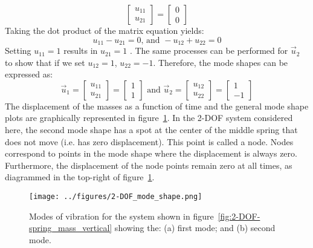 \documentclass[12pt,letter]{article}
\begin{document}
\begin{example}
\begin{equation}
		 \begin{bmatrix} u_{11}\\ u_{21}\end{bmatrix}=\begin{bmatrix} 0\\ 0\end{bmatrix}
	\end{equation}
	Taking the dot product of the matrix equation yields:
	\begin{equation}
		u_{11} - u_{21}=0 \text{, and } - u_{12} + u_{22}=0
	\end{equation}
	Setting $u_{11} = 1$ results in $u_{21} = 1$ . The same processes can be performed for $\vec{u}_2$ to show that if we set $u_{12} = 1$, $u_{22} = -1$. Therefore, the mode shapes can be expressed as:
	\begin{equation}
		 \vec{u}_1 = \begin{bmatrix} u_{11} \\ u_{21} \end{bmatrix} = \begin{bmatrix} 1 \\ 1 \end{bmatrix}\text{ and } \vec{u}_2 = \begin{bmatrix} u_{12} \\ u_{22} \end{bmatrix}  = \begin{bmatrix} 1 \\ -1 \end{bmatrix} 
	\end{equation}
	The displacement of the masses as a function of time and the general mode shape plots are graphically represented in figure~\ref{fig:2-DOF_mode_shape}. In the 2-DOF system considered here, the second mode shape has a spot at the center of the middle spring that does not move (i.e. has zero displacement). This point is called a node. Nodes correspond to points in the mode shape where the displacement is always zero. Furthermore, the displacement of the node points remain zero at all times, as diagrammed in the top-right of figure~\ref{fig:2-DOF_mode_shape}.
	
	\begin{figure}[H]
		\centering
		\texttt{[image: ../figures/2-DOF\_mode\_shape.png]}
		\caption{Modes of vibration for the system shown in figure~\ref{fig:2-DOF-spring_mass_vertical} showing the: (a) first mode; and (b) second mode.}
		\label{fig:2-DOF_mode_shape}
	\end{figure}
	\end{example}
	
\end{document}
